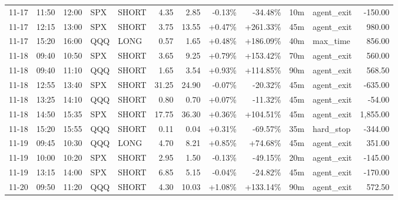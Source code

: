 \documentclass[11pt,a4paper,twoside]{article}
\begin{document}
\begin{center}
\begin{longtable}{>{\color{txtmain}}l l l l l r r r r r >{\color{txtmain}}l r}
11-17 & 11:50 & 12:00 & SPX & SHORT & 4.35 & 2.85 & \textcolor{lossred}{-0.13\%} & \textcolor{lossred}{-34.48\%} & 10m & agent\_exit & \textcolor{lossred}{-150.00} \\
11-17 & 12:15 & 13:00 & SPX & SHORT & 3.75 & 13.55 & \textcolor{wingreen}{+0.47\%} & \textcolor{wingreen}{+261.33\%} & 45m & agent\_exit & \textcolor{wingreen}{980.00} \\
11-17 & 15:20 & 16:00 & QQQ & LONG & 0.57 & 1.65 & \textcolor{wingreen}{+0.48\%} & \textcolor{wingreen}{+186.09\%} & 40m & max\_time & \textcolor{wingreen}{856.00} \\
11-18 & 09:40 & 10:50 & SPX & SHORT & 3.65 & 9.25 & \textcolor{wingreen}{+0.79\%} & \textcolor{wingreen}{+153.42\%} & 70m & agent\_exit & \textcolor{wingreen}{560.00} \\
11-18 & 09:40 & 11:10 & QQQ & SHORT & 1.65 & 3.54 & \textcolor{wingreen}{+0.93\%} & \textcolor{wingreen}{+114.85\%} & 90m & agent\_exit & \textcolor{wingreen}{568.50} \\
11-18 & 12:55 & 13:40 & SPX & SHORT & 31.25 & 24.90 & \textcolor{lossred}{-0.07\%} & \textcolor{lossred}{-20.32\%} & 45m & agent\_exit & \textcolor{lossred}{-635.00} \\
11-18 & 13:25 & 14:10 & QQQ & SHORT & 0.80 & 0.70 & \textcolor{wingreen}{+0.07\%} & \textcolor{lossred}{-11.32\%} & 45m & agent\_exit & \textcolor{lossred}{-54.00} \\
11-18 & 14:50 & 15:35 & SPX & SHORT & 17.75 & 36.30 & \textcolor{wingreen}{+0.36\%} & \textcolor{wingreen}{+104.51\%} & 45m & agent\_exit & \textcolor{wingreen}{1,855.00} \\
11-18 & 15:20 & 15:55 & QQQ & SHORT & 0.11 & 0.04 & \textcolor{wingreen}{+0.31\%} & \textcolor{lossred}{-69.57\%} & 35m & hard\_stop & \textcolor{lossred}{-344.00} \\
11-19 & 09:45 & 10:30 & QQQ & LONG & 4.70 & 8.21 & \textcolor{wingreen}{+0.85\%} & \textcolor{wingreen}{+74.68\%} & 45m & agent\_exit & \textcolor{wingreen}{351.00} \\
11-19 & 10:00 & 10:20 & SPX & SHORT & 2.95 & 1.50 & \textcolor{lossred}{-0.13\%} & \textcolor{lossred}{-49.15\%} & 20m & agent\_exit & \textcolor{lossred}{-145.00} \\
11-19 & 13:15 & 14:00 & SPX & SHORT & 6.85 & 5.15 & \textcolor{lossred}{-0.04\%} & \textcolor{lossred}{-24.82\%} & 45m & agent\_exit & \textcolor{lossred}{-170.00} \\
11-20 & 09:50 & 11:20 & QQQ & SHORT & 4.30 & 10.03 & \textcolor{wingreen}{+1.08\%} & \textcolor{wingreen}{+133.14\%} & 90m & agent\_exit & \textcolor{wingreen}{572.50} \\

\end{longtable}
\end{center}
\end{document}
